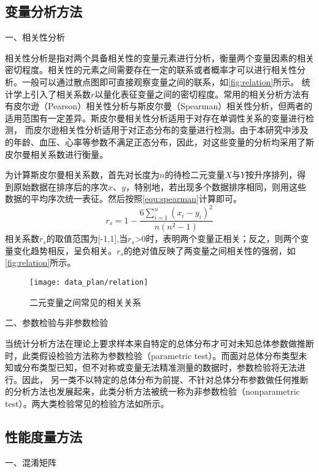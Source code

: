 \subsection{变量分析方法}
一、相关性分析

相关性分析是指对两个具备相关性的变量元素进行分析，衡量两个变量因素的相关密切程度\cite{Zhang2019}。相关性的元素之间需要存在一定的联系或者概率才可以进行相关性分析。一般可以通过散点图即可直接观察变量之间的联系，如\autoref{fig:relation}所示。
统计学上引入了相关系数$r$以量化表征变量之间的密切程度。常用的相关分析方法有有皮尔逊（Pearson）相关性分析与斯皮尔曼（Spearman）相关性分析，但两者的适用范围有一定差异。斯皮尔曼相关性分析适用于对存在单调性关系的变量进行检测，
而皮尔逊相关性分析适用于对正态分布的变量进行检测。由于本研究中涉及的年龄、血压、心率等参数不满足正态分布，因此，对这些变量的分析均采用了斯皮尔曼相关系数进行衡量。

为计算斯皮尔曼相关系数，首先对长度为$n$的待检二元变量$X$与$Y$按升序排列，得到原始数据在排序后的序次$x$、$y$，特别地，若出现多个数据排序相同，则用这些数据的平均序次统一表征。然后按照\autoref{equ:spearman}计算即可。
\begin{equation}
      \label{equ:spearman}
      r_{s}=1-\frac{6\sum_{i=1}^{n}(x_{i}-y_{i})^2}{n(n^2-1)}
\end{equation}
相关系数$r_{s}$的取值范围为[-1,1],当$r_{s}$>0时，表明两个变量正相关；反之，则两个变量变化趋势相反，呈负相关。$r_{s}$的绝对值反映了两变量之间相关性的强弱，如\autoref{fig:relation}所示。
\begin{figure}[htbp]
      \centering
      \texttt{[image: data\_plan/relation]}
      \caption{\label{fig:relation}二元变量之间常见的相关关系}
\end{figure}

二、参数检验与非参数检验

当统计分析方法在理论上要求样本来自特定的总体分布才可对未知总体参数做推断时，此类假设检验方法称为参数检验（parametric test）。而面对总体分布类型未知或分布类型已知，但不对称或变量无法精准测量的数据时，参数检验将无法进行。因此，
另一类不以特定的总体分布为前提、不针对总体分布参数做任何推断的分析方法也发展起来，此类分析方法被统一称为非参数检验（nonparametric test）\cite{Guo2017,Hu2021,Zhang2019}。两大类检验常见的检验方法如所示。

\subsection{性能度量方法}
一、混淆矩阵


